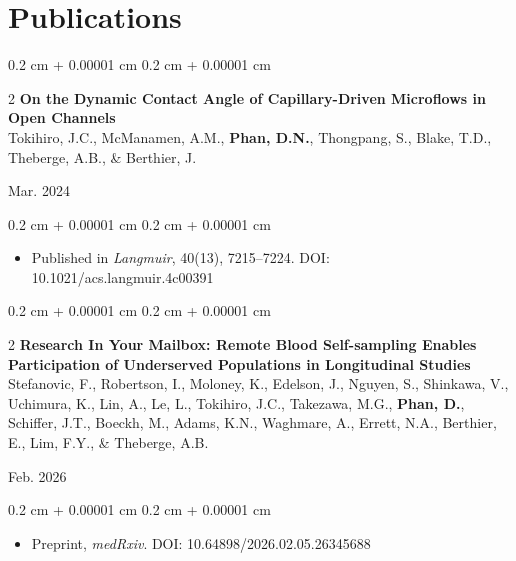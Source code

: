 \documentclass[10pt, letterpaper]{article}
\newenvironment{highlightsforbulletentries}{
    \begin{itemize}[
        topsep=0.10 cm,
        parsep=0.10 cm,
        partopsep=0pt,
        itemsep=0pt,
        leftmargin=10pt
    ]
}{
    \end{itemize}
} %
\newenvironment{onecolentry}{
    \begin{adjustwidth}{
        0.2 cm + 0.00001 cm
    }{
        0.2 cm + 0.00001 cm
    }
}{
    \end{adjustwidth}
} %
\newenvironment{twocolentry}[2][]{
    \onecolentry
    \def\secondColumn{#2}
    \setcolumnwidth{\fill, 4.5 cm}
    \begin{paracol}{2}
}{
    \switchcolumn \raggedleft \secondColumn
    \end{paracol}
    \endonecolentry
} %
\begin{document}
    \section{Publications}
        \begin{twocolentry}{
            Mar. 2024
        }{
            \textbf{On the Dynamic Contact Angle of Capillary-Driven Microflows in Open Channels}\\
            Tokihiro, J.C., McManamen, A.M., \textbf{Phan, D.N.}, Thongpang, S., Blake, T.D., Theberge, A.B.,
            \& Berthier, J.
        }
        \end{twocolentry}
        \vspace{0.1 cm}
        \begin{onecolentry}
            \begin{highlightsforbulletentries}
                \item Published in \textit{Langmuir}, 40(13), 7215–7224. DOI: 10.1021/acs.langmuir.4c00391
            \end{highlightsforbulletentries}
        \end{onecolentry}

        \vspace{0.2 cm}

        \begin{twocolentry}{
            Feb. 2026
        }{
            \textbf{Research In Your Mailbox: Remote Blood Self-sampling Enables Participation of Underserved
            Populations in Longitudinal Studies}\\
            Stefanovic, F., Robertson, I., Moloney, K., Edelson, J., Nguyen, S., Shinkawa, V., Uchimura, K., Lin, A.,
            Le, L., Tokihiro, J.C., Takezawa, M.G., \textbf{Phan, D.}, Schiffer, J.T., Boeckh, M., Adams, K.N.,
            Waghmare, A., Errett, N.A., Berthier, E., Lim, F.Y., \& Theberge, A.B.
        }
        \end{twocolentry}
        \vspace{0.1 cm}
        \begin{onecolentry}
            \begin{highlightsforbulletentries}
                \item Preprint, \textit{medRxiv}. DOI: 10.64898/2026.02.05.26345688
            \end{highlightsforbulletentries}
        \end{onecolentry}
\end{document}
